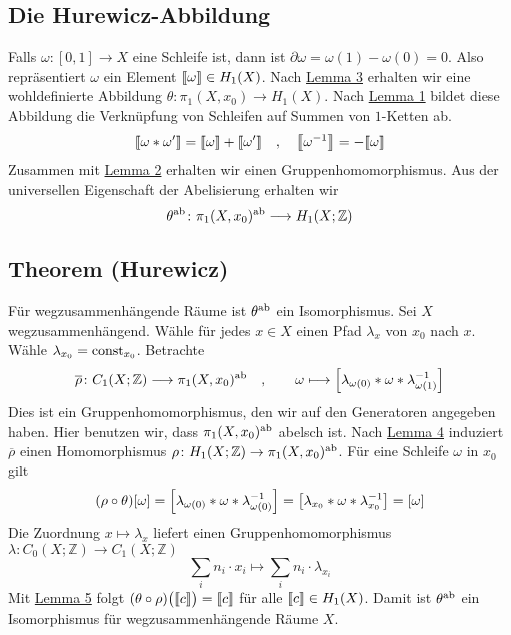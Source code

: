 \subsection{Die Hurewicz-Abbildung} %
\label{sub:159}
Falls $\omega \colon [0,1] \to X$ eine Schleife ist, dann ist $\partial \omega = \omega(1)- \omega(0)=0$. Also repräsentiert $\omega$ ein Element 
$\homologieklasse{\omega} \in H_1(X)$. Nach \hyperref[sub:158]{Lemma 3} erhalten wir eine wohldefinierte Abbildung $\theta \colon \pi_1(X,x_0) \to H_1(X)$. Nach 
\hyperref[sub:156]{Lemma 1} bildet diese Abbildung die Verknüpfung von Schleifen auf Summen von $1$-Ketten ab.
\begin{align*}
	\homologieklasse*{\omega * \omega'} = \homologieklasse*{\omega} + \homologieklasse*{\omega'} \quad ,\quad  \homologieklasse*{\omega ^{-1}} = - \homologieklasse*{\omega}
\end{align*}
Zusammen mit \hyperref[sub:157]{Lemma 2} erhalten wir einen Gruppenhomomorphismus. Aus der universellen Eigenschaft der Abelisierung erhalten wir 
\[
	\theta^\ab \colon \pi_1(X,x_0)^\ab \longrightarrow H_1(X;\mathds{Z})
\]

\subsection{Theorem (Hurewicz)} %
\label{sub:1510}
Für wegzusammenhängende Räume ist $\theta^\ab$ ein Isomorphismus.
Sei $X$ wegzusammenhängend. Wähle für jedes $x \in X$ einen Pfad $\lambda_x$ von $x_0$ nach $x$. Wähle $\lambda_{x_0} = \const_{x_0}$. Betrachte 
\[
	\overline{\rho} \colon C_1(X;\mathds{Z}) \longrightarrow \pi_1(X,x_0)^\ab \quad , 
	\qquad  \omega \longmapsto \benbrace*{\lambda_{\omega(0)} * \omega * \lambda_{\omega(1)}^{-1}}
\]
Dies ist ein Gruppenhomomorphismus, den wir auf den Generatoren angegeben haben. Hier benutzen wir, dass $\pi_1(X,x_0)^\ab$ abelsch ist.
Nach \hyperref[sub:1511]{Lemma 4} induziert $\overline{\rho}$ einen Homomorphismus $\rho \colon H_1(X;\mathds{Z}) \to \pi_1(X,x_0)^\ab$. Für eine Schleife $\omega$ in $x_0$ 
gilt
\begin{align*}
	(\rho \circ \theta)[\omega] = \benbrace*{\lambda_{\omega(0)} * \omega * \lambda_{\omega(0)} ^{-1}} = \benbrace*{\lambda_{x_0} * \omega * \lambda_{x_0}^{-1}}=[\omega] 
\end{align*}
Die Zuordnung $x \mapsto \lambda_x$ liefert einen Gruppenhomomorphismus $\lambda \colon C_0(X;\mathds{Z}) \to C_1(X;\mathds{Z})$  
\[
	\sum_{i} n_i \cdot x_i  \longmapsto \sum_i n_i \cdot \lambda_{x_i}
\]
Mit \hyperref[sub:1512]{Lemma 5} folgt $(\theta \circ \rho)\enbrace[\big]{\homologieklasse{c}} = \homologieklasse{c}$ für alle $\homologieklasse{c} \in H_1(X)$. 
Damit ist $\theta^\ab$ ein Isomorphismus für wegzusammenhängende Räume $X$. \bewende

